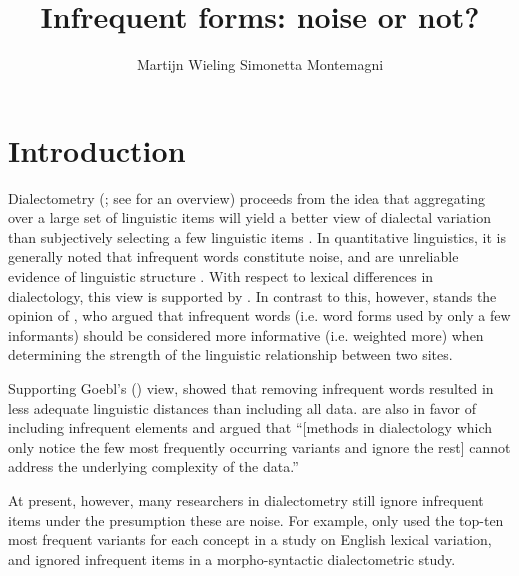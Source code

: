 \documentclass[output=paper]{LSP/langsci}
\author{Martijn Wieling\affiliation{University of Groningen, CLCG} \lastand  Simonetta Montemagni\affiliation{CNR, Istituto di Linguistica Computationale ‘Antonio Zampolli’}}
\title{Infrequent forms: noise or not?}
\begin{document}
  

 

\section{Introduction}
Dialectometry (\citealt{seguy_relation_1971}; see \citealt{wieling_advances_2015} for an overview) proceeds from the idea that aggregating over a large set of linguistic items will yield a better view of dialectal variation than subjectively selecting a few linguistic items \citep[190--191]{nerbonne_data-driven_2009}.  In quantitative linguistics, it is generally noted that infrequent words constitute noise, and are unreliable evidence of linguistic structure \citep[199]{manning_foundations_1999}. With respect to lexical differences in dialectology, this view is supported by \citet[17]{carver_american_1987}. In contrast to this, however, stands the opinion of \citet[Vol I: 83--86]{goebl_dialektometrische_1984}, who argued that infrequent words (i.e. word forms used by only a few informants) should be considered more informative (i.e. weighted more) when determining the strength of the linguistic relationship between two sites.

Supporting Goebl's (\citeyear{goebl_dialektometrische_1984}) view, \citet{nerbonne_toward_2007} showed that removing infrequent words resulted in less adequate linguistic distances than including all data. \citet[173]{kretzschmar_scaled_2013} are also in favor of including infrequent elements and argued that ``[methods in dialectology which only notice the few most frequently occurring variants and ignore the rest] cannot address the underlying complexity of the data.''

At present, however, many researchers in dialectometry still ignore infrequent items under the presumption these are noise. For example, \citet{wieling_analyzing_2014} only used the top-ten most frequent variants for each concept in a study on English lexical variation, and \citet{szmrecsanyi_corpus-based_2011} ignored infrequent items in a morpho-syntactic dialectometric study. 
\end{document}
